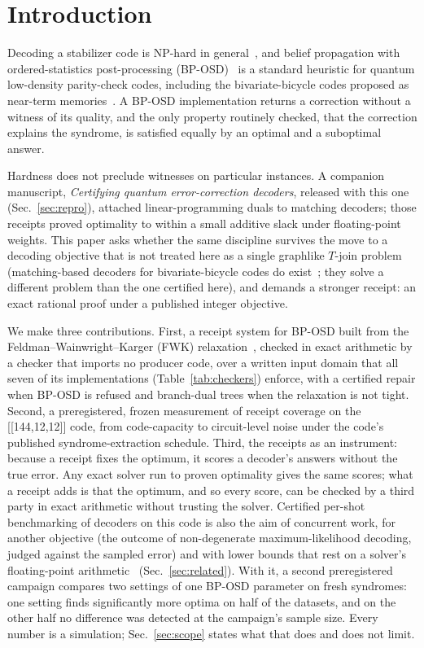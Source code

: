 \documentclass[aps,pra,twocolumn,superscriptaddress,nofootinbib,longbibliography,floatfix]{revtex4-2}
\begin{document}
\section{Introduction}

Decoding a stabilizer code is NP-hard in general~\cite{berlekamp1978,hsieh2011np}, and belief propagation with ordered-statistics post-processing (BP-OSD)~\cite{panteleev2021degenerate,roffe2020decoding} is a standard heuristic for quantum low-density parity-check codes, including the bivariate-bicycle codes proposed as near-term memories~\cite{bravyi2024high}. A BP-OSD implementation returns a correction without a witness of its quality, and the only property routinely checked, that the correction explains the syndrome, is satisfied equally by an optimal and a suboptimal answer.

Hardness does not preclude witnesses on particular instances. A companion manuscript, \textit{Certifying quantum error-correction decoders}, released with this one (Sec.~\ref{sec:repro}), attached linear-programming duals to matching decoders; those receipts proved optimality to within a small additive slack under floating-point weights. This paper asks whether the same discipline survives the move to a decoding objective that is not treated here as a single graphlike $T$-join problem (matching-based decoders for bivariate-bicycle codes do exist~\cite{sahay2026matching}; they solve a different problem than the one certified here), and demands a stronger receipt: an exact rational proof under a published integer objective.

We make three contributions. First, a receipt system for BP-OSD built from the Feldman--Wainwright--Karger (FWK) relaxation~\cite{feldman2005lp}, checked in exact arithmetic by a checker that imports no producer code, over a written input domain that all seven of its implementations (Table~\ref{tab:checkers}) enforce, with a certified repair when BP-OSD is refused and branch-dual trees when the relaxation is not tight. Second, a preregistered, frozen measurement of receipt coverage on the [[144,12,12]] code, from code-capacity to circuit-level noise under the code's published syndrome-extraction schedule. Third, the receipts as an instrument: because a receipt fixes the optimum, it scores a decoder's answers without the true error. Any exact solver run to proven optimality gives the same scores; what a receipt adds is that the optimum, and so every score, can be checked by a third party in exact arithmetic without trusting the solver. Certified per-shot benchmarking of decoders on this code is also the aim of concurrent work, for another objective (the outcome of non-degenerate maximum-likelihood decoding, judged against the sampled error) and with lower bounds that rest on a solver's floating-point arithmetic~\cite{banfi2026certified} (Sec.~\ref{sec:related}). With it, a second preregistered campaign compares two settings of one BP-OSD parameter on fresh syndromes: one setting finds significantly more optima on half of the datasets, and on the other half no difference was detected at the campaign's sample size. Every number is a simulation; Sec.~\ref{sec:scope} states what that does and does not limit.
\end{document}
